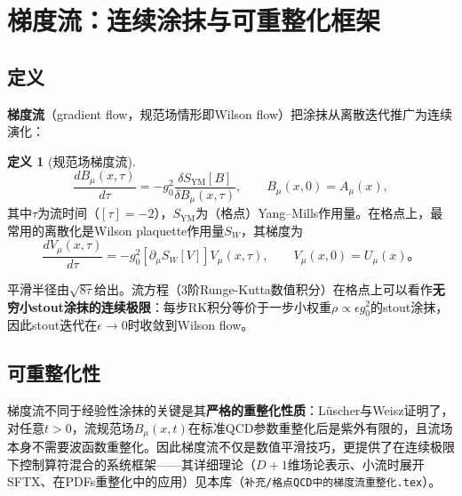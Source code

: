 \documentclass[12pt,a4paper]{ctexart}
\theoremstyle{definition}
\newtheorem{definition}{定义}[section]
\begin{document}
\section{梯度流：连续涂抹与可重整化框架}

\subsection{定义}

\textbf{梯度流}（gradient flow，规范场情形即Wilson flow）把涂抹从离散迭代推广为连续演化\cite{Luscher2010,LuscherWeisz2011}：

\begin{definition}[规范场梯度流]
\begin{equation}
\frac{dB_\mu(x, \tau)}{d\tau} = -g_0^2 \frac{\delta S_{\text{YM}}[B]}{\delta B_\mu(x, \tau)},
\qquad B_\mu(x, 0) = A_\mu(x),
\label{eq:wilson_flow}
\end{equation}
其中$\tau$为流时间（$[\tau] = -2$），$S_{\text{YM}}$为（格点）Yang--Mills作用量。在格点上，最常用的离散化是Wilson plaquette作用量$S_W$，其梯度为
\begin{equation}
\frac{dV_\mu(x,\tau)}{d\tau} = -g_0^2 \left[ \partial_{\mu} S_W[V] \right] V_\mu(x,\tau),
\qquad V_\mu(x,0) = U_\mu(x)。
\label{eq:wilson_flow_lattice}
\end{equation}
\end{definition}

平滑半径由$\sqrt{8\tau}$给出。流方程（3阶Runge-Kutta数值积分）在格点上可以看作\textbf{无穷小stout涂抹的连续极限}：每步RK积分等价于一步小权重$\rho \propto \epsilon g_0^2$的stout涂抹，因此stout迭代在$\epsilon \to 0$时收敛到Wilson flow\cite{Luscher2010}。

\subsection{可重整化性}

梯度流不同于经验性涂抹的关键是其\textbf{严格的重整化性质}：L\"uscher与Weisz证明了，对任意$t>0$，流规范场$B_\mu(x,t)$在标准QCD参数重整化后是紫外有限的，且流场本身不需要波函数重整化\cite{LuscherWeisz2011}。因此梯度流不仅是数值平滑技巧，更提供了在连续极限下控制算符混合的系统框架——其详细理论（$D+1$维场论表示、小流时展开SFTX、在PDFs重整化中的应用）见本库\cite{GradientFlowDoc}（\texttt{补充/格点QCD中的梯度流重整化.tex}）。

\end{document}
